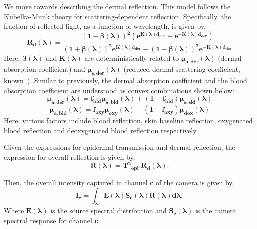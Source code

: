 We move towards describing the dermal reflection. This model follows the Kubelka-Munk theory for scattering-dependent reflection. Specifically, the fraction of reflected light, as a function of wavelength, is given by,
\begin{equation}
    \mathbf{R_{d}(\boldsymbol\lambda)=\frac{(1-\boldsymbol\beta(\boldsymbol\lambda))^2(e^{K(\boldsymbol\lambda)d_{der}}-e^{-K(\boldsymbol\lambda)d_{der}})}{(1+\boldsymbol\beta(\boldsymbol\lambda))^2e^{K(\boldsymbol\lambda)d_{der}}-(1-\boldsymbol\beta(\boldsymbol\lambda))^2e^{-K(\boldsymbol\lambda)d_{der}}}}
\end{equation}
Here, $\mathbf{\boldsymbol\beta(\boldsymbol\lambda)}$ and $\mathbf{K(\boldsymbol\lambda)}$ are deterministically related to $\mathbf{\boldsymbol\mu_{a,der}(\boldsymbol\lambda)}$ (dermal absorption coefficient) and $\mathbf{\boldsymbol\mu_{s,der}(\boldsymbol\lambda)}$ (reduced dermal scattering coefficient, known~\cite{}). Similar to previously, the dermal absorption coefficient and the blood absorption coefficient are understood as convex combinations shown below:
\begin{equation}
    \mathbf{\boldsymbol\mu_{a,der}(\boldsymbol\lambda)=f_{bld}\boldsymbol\mu_{a,bld}(\boldsymbol\lambda)+(1-f_{bld})\boldsymbol\mu_{a,ski}(\boldsymbol\lambda)}
\end{equation}
\begin{equation}
    \mathbf{\boldsymbol\mu_{a,bld}(\boldsymbol\lambda)=f_{oxy}\boldsymbol\mu_{oxy}(\boldsymbol\lambda)+(1-f_{oxy})\boldsymbol\mu_{dox}(\boldsymbol\lambda)}
\end{equation}
Here, various factors include blood reflection, skin baseline reflection, oxygenated blood reflection and deoxygenated blood reflection respectively.

Given the expressions for epidermal transmission and dermal reflection, the expression for overall reflection is given by,
\begin{equation}
    \mathbf{R(\boldsymbol\lambda) = T{^2}_{epi}.R_{d}(\boldsymbol\lambda)}.
\end{equation}

Then, the overall intensity captured in channel $\mathbf{c}$ of the camera is given by,
\begin{equation}
    \mathbf{I_c=\boldsymbol\int_{\boldsymbol\lambda}E(\boldsymbol\lambda)S_{c}(\boldsymbol\lambda)R(\boldsymbol\lambda)d\boldsymbol\lambda},
\end{equation}
Where $\mathbf{E(\boldsymbol\lambda)}$ is the source spectral distribution and $\mathbf{S_{c}(\boldsymbol\lambda)}$ is the camera spectral response for channel $\mathbf{c}$.

